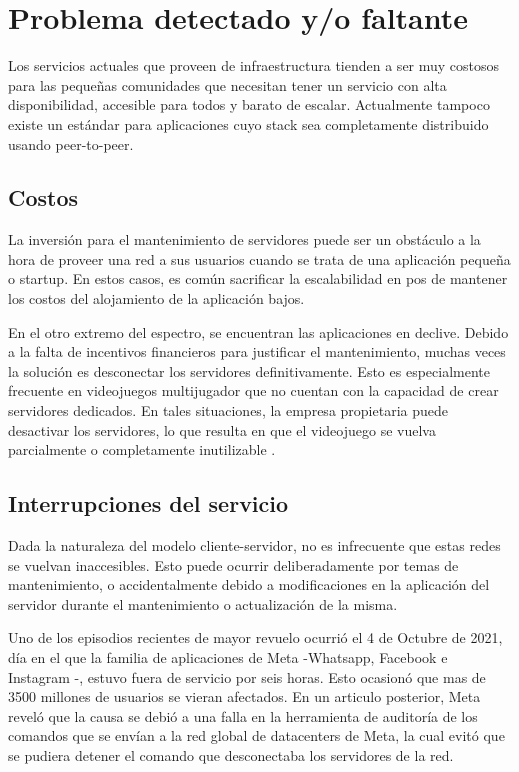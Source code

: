 \section{Problema detectado y/o faltante}
Los servicios actuales que proveen de infraestructura tienden a ser muy costosos para las pequeñas comunidades que necesitan tener un servicio con alta disponibilidad, accesible para todos y barato de escalar. Actualmente tampoco existe un estándar para aplicaciones cuyo stack sea completamente distribuido usando peer-to-peer.

\subsection{Costos}
La inversión para el mantenimiento de servidores puede ser un obstáculo a la hora de proveer una red a sus usuarios cuando se trata de una aplicación pequeña o startup. En estos casos, es común sacrificar la escalabilidad en pos de mantener los costos del alojamiento de la aplicación bajos.

En el otro extremo del espectro, se encuentran las aplicaciones en declive. Debido a la falta de incentivos financieros para justificar el mantenimiento, muchas veces la solución es desconectar los servidores definitivamente. Esto es especialmente frecuente en videojuegos multijugador que no cuentan con la capacidad de crear servidores dedicados. En tales situaciones, la empresa propietaria puede desactivar los servidores, lo que resulta en que el videojuego se vuelva parcialmente o completamente inutilizable \cite{dead-games}.

\subsection{Interrupciones del servicio}
Dada la naturaleza del modelo cliente-servidor, no es infrecuente que estas redes se vuelvan inaccesibles. Esto puede ocurrir deliberadamente por temas de mantenimiento, o accidentalmente debido a modificaciones en la aplicación del servidor durante el mantenimiento o actualización de la misma.

Uno de los episodios recientes de mayor revuelo ocurrió el 4 de Octubre de 2021, día en el que la familia de aplicaciones de Meta -Whatsapp, Facebook e Instagram -, estuvo fuera de servicio por seis horas. Esto ocasionó que mas de 3500 millones de usuarios se vieran afectados. En un articulo posterior, Meta reveló que la causa se debió a una falla en la herramienta de auditoría de los comandos que se envían a la red global de datacenters de Meta, la cual evitó que se pudiera detener el comando que desconectaba los servidores de la red. \parencite{meta-offline}

